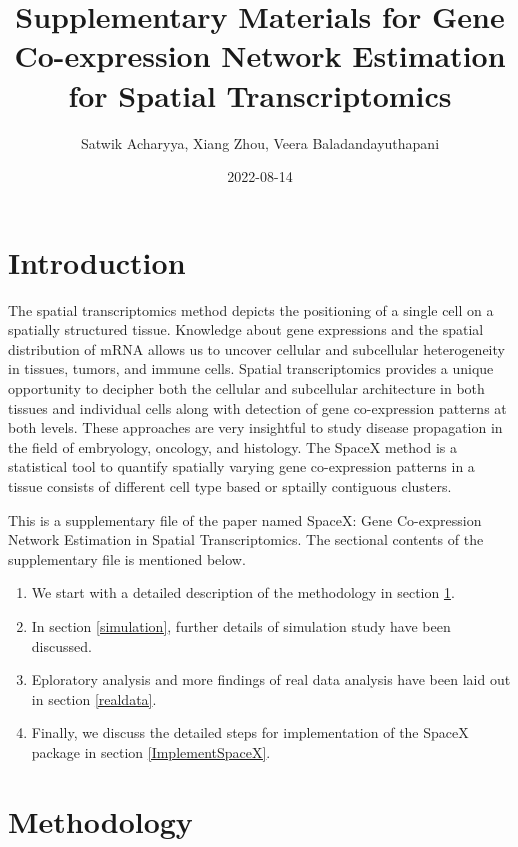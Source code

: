 \documentclass[
]{book}
\title{Supplementary Materials for Gene Co-expression Network Estimation for Spatial Transcriptomics}
\author{Satwik Acharyya, Xiang Zhou, Veera Baladandayuthapani}
\date{2022-08-14}
\providecommand{\tightlist}{%
  \setlength{\itemsep}{0pt}\setlength{\parskip}{0pt}}
\begin{document}
\maketitle

{
\setcounter{tocdepth}{1}
\tableofcontents
}
\hypertarget{appendix-supplementary-materials}{%
\appendix}


\hypertarget{introduction}{%
\chapter*{Introduction}\label{introduction}}

The spatial transcriptomics method depicts the positioning of a single cell on a spatially structured tissue. Knowledge about gene expressions and the spatial distribution of mRNA allows us to uncover cellular and subcellular heterogeneity in tissues, tumors, and immune cells. Spatial transcriptomics provides a unique opportunity to decipher both the cellular and subcellular architecture in both tissues and individual cells along with detection of gene co-expression patterns at both levels. These approaches are very insightful to study disease propagation in the field of embryology, oncology, and histology. The SpaceX method is a statistical tool to quantify spatially varying gene co-expression patterns in a tissue consists of different cell type based or sptailly contiguous clusters.

This is a supplementary file of the paper named SpaceX: Gene Co-expression Network Estimation in Spatial Transcriptomics. The sectional contents of the supplementary file is mentioned below.

\begin{enumerate}
\def\labelenumi{\arabic{enumi}.}
\tightlist
\item
  We start with a detailed description of the methodology in section \ref{method}.
\item
  In section \ref{simulation}, further details of simulation study have been discussed.
\item
  Eploratory analysis and more findings of real data analysis have been laid out in section \ref{realdata}.
\item
  Finally, we discuss the detailed steps for implementation of the SpaceX package in section \ref{ImplementSpaceX}.
\end{enumerate}

\hypertarget{method}{%
\chapter{Methodology}\label{method}}
\end{document}
